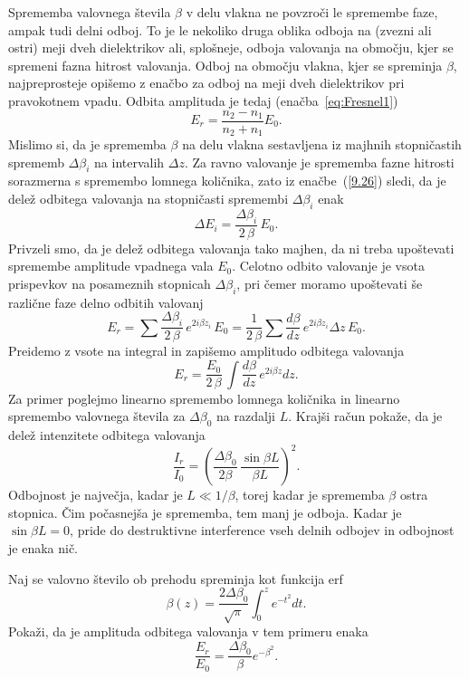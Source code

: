 Sprememba valovnega števila $\beta$ v delu vlakna ne povzroči le spremembe faze, 
ampak tudi delni odboj.
To je le nekoliko druga oblika odboja na (zvezni ali ostri) meji 
dveh dielektrikov ali, splošneje, odboja valovanja na območju,
kjer se spremeni fazna hitrost valovanja.
Odboj na območju vlakna, kjer se spreminja $\beta$, najpreprosteje opišemo 
z enačbo za odboj na meji dveh dielektrikov pri pravokotnem
vpadu. Odbita amplituda je tedaj (enačba~\ref{eq:Fresnel1})
\begin{equation}
E_{r}=\frac{n_{2}-n_{1}}{n_{2}+n_{1}}E_{0}.
\label{9.26}
\end{equation}
Mislimo si, da je sprememba $\beta$ na delu vlakna sestavljena iz
majhnih stopničastih sprememb $\Delta\beta_{i}$ na intervalih $\Delta z$.
Za ravno valovanje je sprememba fazne hitrosti sorazmerna s spremembo
lomnega količnika, zato iz enačbe~(\ref{9.26}) sledi, da je delež odbitega
valovanja na stopničasti spremembi $\Delta\beta_{i}$ enak
\begin{equation}
\Delta E_{i}=\frac{\Delta\beta_{i}}{2\,\beta}\, E_{0}.
\label{9.27}
\end{equation}
Privzeli smo, da je delež odbitega valovanja tako majhen, da ni treba upoštevati 
spremembe amplitude vpadnega vala $E_{0}$. Celotno odbito valovanje je vsota 
prispevkov na posameznih stopnicah $\Delta\beta_{i}$,
pri čemer moramo upoštevati še različne faze delno odbitih valovanj
\begin{equation}
E_{r}=\sum\frac{\Delta\beta_{i}}{2\,\beta}\, e^{2i\beta z_{i}}\, 
E_{0}=\frac{1}{2\,\beta}\sum\frac{d\beta}{dz}\, e^{2i\beta z_{i}}\Delta z\, E_{0}.
\label{9.28}
\end{equation}
Preidemo z vsote na integral in zapišemo amplitudo odbitega valovanja
\begin{equation}
E_{r}=\frac{E_{0}}{2\,\beta}\,\int\frac{d\beta}{dz}\, e^{2i\beta z}dz.
\label{9.29}
\end{equation}
Za primer poglejmo linearno spremembo lomnega količnika in linearno spremembo 
valovnega števila za $\Delta\beta_{0}$ na razdalji $L$. Krajši račun pokaže, da je 
delež intenzitete odbitega valovanja 
\begin{equation}
\frac{I_{r}}{I_{0}}=\left( \frac{\Delta\beta_{0}}{2 \beta}\,\frac{\sin\beta L}{\beta L}\right)^2.
\label{9.30}
\end{equation}
Odbojnost je največja, kadar je $L \ll 1/\beta$,
torej kadar je sprememba $\beta$ ostra stopnica. Čim počasnejša je
sprememba, tem manj je odboja. Kadar je $\sin\beta L=0$, pride do destruktivne 
interference vseh delnih odbojev in odbojnost je enaka nič.

\begin{definition}
Naj se valovno število ob prehodu spreminja kot funkcija erf
\begin{equation}
\beta (z)= \frac{2\Delta \beta_0}{\sqrt{\pi}} \int_0^z e^{-t^2}dt.
\end{equation}
Pokaži, da je amplituda odbitega valovanja v tem primeru enaka
\begin{equation}
\frac{E_r}{E_0} = \frac{\Delta \beta_0}{\beta}e^{-\beta^2}.
\end{equation}
\end{definition}
